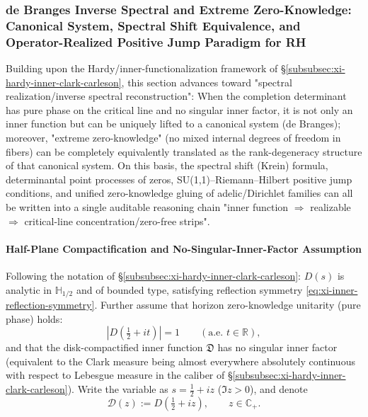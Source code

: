 \subsubsection{de Branges Inverse Spectral and Extreme Zero-Knowledge: Canonical System, Spectral Shift Equivalence, and Operator-Realized Positive Jump Paradigm for RH}\label{subsubsec:xi-debranges-canonical-rhp-adelic}
Building upon the Hardy/inner-functionalization framework of \S\ref{subsubsec:xi-hardy-inner-clark-carleson}, this section advances toward "spectral realization/inverse spectral reconstruction":
When the completion determinant has pure phase on the critical line and no singular inner factor, it is not only an inner function but can be uniquely lifted to a canonical system (de Branges);
moreover, "extreme zero-knowledge" (no mixed internal degrees of freedom in fibers) can be completely equivalently translated as the rank-degeneracy structure of that canonical system.
On this basis, the spectral shift (Krein) formula, determinantal point processes of zeros, SU(1,1)--Riemann--Hilbert positive jump conditions, and unified zero-knowledge gluing of adelic/Dirichlet families can all be written into a single auditable reasoning chain "inner function \(\Rightarrow\) realizable \(\Rightarrow\) critical-line concentration/zero-free strips".

\paragraph{Half-Plane Compactification and No-Singular-Inner-Factor Assumption}
Following the notation of \S\ref{subsubsec:xi-hardy-inner-clark-carleson}: \(D(s)\) is analytic in \(\mathbb{H}_{1/2}\) and of bounded type, satisfying reflection symmetry \eqref{eq:xi-inner-reflection-symmetry}.
Further assume that horizon zero-knowledge unitarity (pure phase) holds:
\[
|D(\tfrac12+it)|=1\qquad(\text{a.e. }t\in\mathbb{R}),
\]
and that the disk-compactified inner function \(\mathfrak{D}\) has no singular inner factor (equivalent to the Clark measure being almost everywhere absolutely continuous with respect to Lebesgue measure in the caliber of \S\ref{subsubsec:xi-hardy-inner-clark-carleson}).
Write the variable as \(s=\tfrac12+iz\) (\(\Im z>0\)), and denote
\[
\mathcal{D}(z):=D(\tfrac12+iz),
\qquad z\in\mathbb{C}_+.
\]

